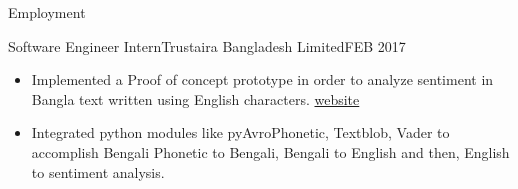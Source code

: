 \documentclass[]{mcdowellcv}
\begin{document}
\begin{cvsection}{Employment}
    	\begin{cvsubsection}{Software Engineer Intern}{Trustaira Bangladesh Limited}{FEB 2017}
    	    \begin{itemize}
    	        \item Implemented a Proof of concept prototype in order to analyze sentiment in Bangla text written using English characters. \href{https://techfoxweb.wordpress.com/2017/07/24/banglish-sentiment-analysis/}{website}
    	        \item Integrated python modules like pyAvroPhonetic, Textblob, Vader to accomplish Bengali Phonetic to Bengali, Bengali to English and then, English to sentiment analysis. 
    	        
    	    \end{itemize}
    	
    	\end{cvsubsection}
    	
    
        
    	        
    	
	
	
	
	\end{cvsection}
	
\end{document}
